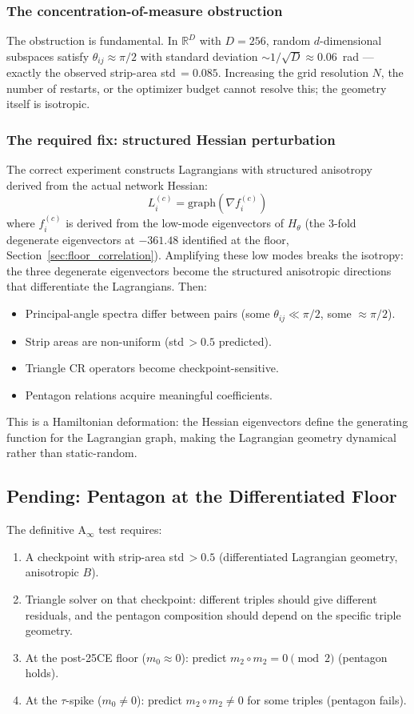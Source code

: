 \documentclass[11pt]{amsart}
\begin{document}
\subsubsection*{The concentration-of-measure obstruction}

The obstruction is fundamental.
In $\mathbb{R}^D$ with $D = 256$, random $d$-dimensional subspaces
satisfy $\theta_{ij} \approx \pi/2$ with standard deviation
$\sim 1/\sqrt{D} \approx 0.06$~rad --- exactly the observed
strip-area std\,$= 0.085$.
Increasing the grid resolution $N$, the number of restarts,
or the optimizer budget cannot resolve this; the geometry itself
is isotropic.

\subsubsection*{The required fix: structured Hessian perturbation}

The correct experiment constructs Lagrangians with structured
anisotropy derived from the actual network Hessian:
\[
  L_i^{(c)} = \mathrm{graph}(\nabla f_i^{(c)})
\]
where $f_i^{(c)}$ is derived from the low-mode eigenvectors of
$H_\theta$ (the 3-fold degenerate eigenvectors at $-361.48$
identified at the floor, Section~\ref{sec:floor_correlation}).
Amplifying these low modes breaks the isotropy:
the three degenerate eigenvectors become the structured anisotropic
directions that differentiate the Lagrangians.
Then:
\begin{itemize}
\item Principal-angle spectra differ between pairs
  (some $\theta_{ij} \ll \pi/2$, some $\approx \pi/2$).
\item Strip areas are non-uniform (std\,$> 0.5$ predicted).
\item Triangle CR operators become checkpoint-sensitive.
\item Pentagon relations acquire meaningful coefficients.
\end{itemize}
This is a Hamiltonian deformation: the Hessian eigenvectors
define the generating function for the Lagrangian graph,
making the Lagrangian geometry dynamical rather than static-random.

\subsection{Pending: Pentagon at the Differentiated Floor}

The definitive A$_\infty$ test requires:
\begin{enumerate}
\item A checkpoint with strip-area std\,$> 0.5$
  (differentiated Lagrangian geometry, anisotropic $B$).
\item Triangle solver on that checkpoint:
  different triples should give different residuals,
  and the pentagon composition should depend on
  the specific triple geometry.
\item At the post-25CE floor ($m_0 \approx 0$):
  predict $m_2 \circ m_2 = 0 \pmod{2}$ (pentagon holds).
\item At the $\tau$-spike ($m_0 \neq 0$):
  predict $m_2 \circ m_2 \neq 0$ for some triples (pentagon fails).
\end{enumerate}
\end{document}
